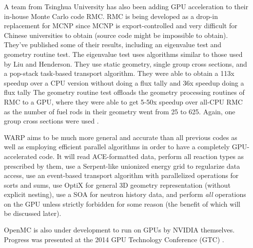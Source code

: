 A team from Tsinghua University has also been adding GPU acceleration to their in-house Monte Carlo code RMC. RMC is being developed as a drop-in replacement for MCNP since MCNP is export-controlled and very difficult for Chinese universities to obtain (source code might be impossible to obtain).  They've published some of their results, including an eigenvalue test and geometry routine test.  The eigenvalue test uses algorithms similar to those used by Liu and Henderson.  They use static geometry, single group cross sections, and a pop-stack task-based transport algorithm.  They were able to obtain a 113x speedup over a CPU version without doing a flux tally and 36x speedup doing a flux tally \cite{qixu_ans_winter}   The geometry routine test offloads the geometry processing routines of RMC to a GPU, where they were able to get 5-50x speedup over all-CPU RMC as the number of fuel rods in their geometry went from 25 to 625.  Again, one group cross sections were used \cite{qixu}.

WARP aims to be much more general and accurate than all previous codes as well as employing efficient parallel algorithms in order to have a completely GPU-accelerated code.  It will read ACE-formatted data, perform all reaction types as prescribed by them, use a Serpent-like unionized energy grid to regularize data access, use an event-based transport algorithm with parallelized operations for sorts and sums, use OptiX for general 3D geometry representation (without explicit nesting), use a SOA for neutron history data, and perform \emph{all} operations on the GPU unless strictly forbidden for some reason (the benefit of which will be discussed later).
	
OpenMC is also under development to run on GPUs by NVIDIA themselves.  Progress was presented at the 2014 GPU Technology Conference (GTC) \cite{openmc_gtc}.
